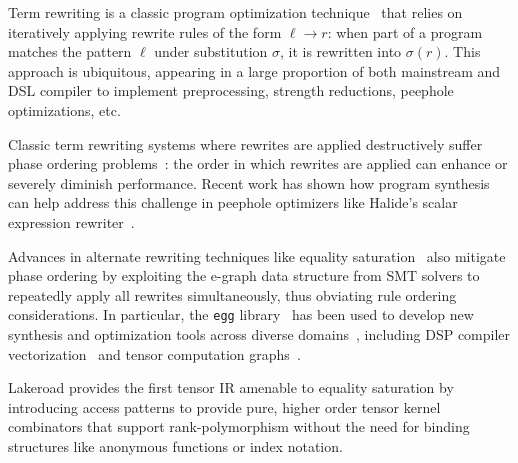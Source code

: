 \documentclass[prologue, dvipsnames, sigplan, screen, review, anonymous]{acmart}
\newcommand{\g}{Lakeroad\xspace}
\newcommand{\tcd}[1]{\texttt{#1}}
\begin{document}
Term rewriting is a classic
  program optimization technique~\cite{baader1998term}
  that relies on iteratively applying
  rewrite rules of the form $\ell \xrightarrow{} r$:
  when part of a program
  matches the pattern $\ell$
  under substitution $\sigma$,
  it is rewritten into $\sigma(r)$.
This approach is ubiquitous,
  appearing in a large proportion
  of both mainstream and DSL compiler
  to implement preprocessing,
  strength reductions,
  peephole optimizations, etc.~\cite{garavel2018rewrite-context}
  
Classic term rewriting systems where
  rewrites are applied destructively suffer
  phase ordering problems~\cite{phase-ordering}:
  the order in which rewrites are applied can
  enhance or severely diminish performance.
Recent work has shown how program synthesis
  can help address this challenge in
  peephole optimizers like Halide's
  scalar expression rewriter~\cite{
    newcomb2020halide-rewrite}.
  
Advances in alternate rewriting techniques
  like equality saturation~\cite{tate2009equality}
  also mitigate phase ordering by exploiting
  the e-graph data structure from SMT solvers
  to repeatedly apply all rewrites simultaneously,
  thus obviating rule ordering considerations.
In particular,
  the \tcd{egg} library~\cite{willsey2021egg}
  has been used to develop new synthesis and
  optimization tools across diverse domains~\cite{
    herbie, szalinski, wang2020spores},
  including DSP compiler vectorization~\cite{
    vanhattum2021vectorization} and
  tensor computation graphs~\cite{yang2021equality}.

\g provides the first tensor IR
  amenable to equality saturation by
  introducing access patterns to
  provide pure, higher order tensor
  kernel combinators that support
  rank-polymorphism without the need
  for binding structures like
  anonymous functions or index notation.


  
\end{document}
